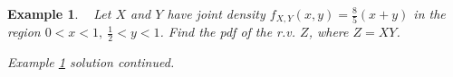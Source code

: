 \documentclass[12pt]{amsart}
\newtheorem{example}[theorem]{Example}
\newcommand\pdfXY{f_{X,Y}(x,y)}
\begin{document}
{\begin{example}\label{XY_pdf}\ %
Let $X$ and $Y$ have joint density $\pdfXY = \frac85(x+y)$ in the region $0 < x < 1,\ \frac12 < y <1$.
Find the pdf of the r.v. $Z$, where $Z=XY$.

\end{example}


\newpage
\textit{Example \ref{XY_pdf} solution continued.}


}  %
\end{document}
